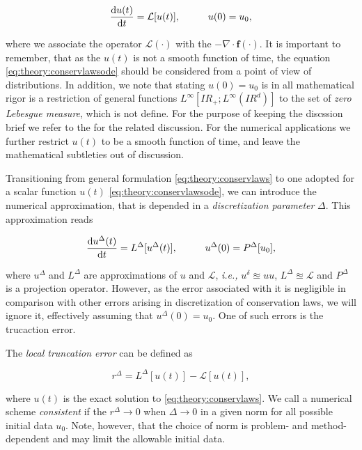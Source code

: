 \begin{equation}
\frac{\text{d}u(t)}{\text{d}t} = \mathcal{L}[u(t)], \hspace{10mm} u(0) = u_0,
\label{eq:theory:conservlawsode}
\end{equation}

where we associate the operator $\mathcal{L}(\cdot)$ with the $-\nabla\cdot\boldsymbol{f}(\cdot)$. 
It is important to remember, that as the $u(t)$ is not a smooth function of time, the equation \ref{eq:theory:conservlawsode} should be considered from a point of view of distributions. 
In addition, we note that stating $u(0) = u_0$ is in all mathematical rigor is a restriction of general functions $L^{\infty}[I\!R_{+};L^{\infty}(I\!R^d)]$ to the set of \textit{zero Lebesgue measure}, which is not define. 
For the purpose of keeping the discssion brief we refer to the \cite{Kruzkov:1970} for the related discussion. 
For the numerical applications we further restrict $u(t)$ to be a smooth function of time, and leave the mathematical subtleties out of discussion. 

Transitioning from general formulation \ref{eq:theory:conservlaws} to one adopted for a scalar function $u(t)$ \ref{eq:theory:conservlawsode}, we can introduce the numerical approximation, that is depended in a \textit{discretization parameter} $\Delta$. 
This approximation reads

\begin{equation}
\frac{\text{d}u^{\Delta}(t)}{\text{d}t} = L^{\Delta}[u^{\Delta}(t)], \hspace{10mm} u^{\Delta}(0) = P^{\Delta}[u_0],
\label{eq:theory:conservlawsodepde}
\end{equation}

where $u^{\Delta}$ and $L^{\Delta}$ are approximations of $u$ and $\mathcal{L}$, \textit{i.e.,} $u^{\delta}\approxeq u u$, $L^{\Delta}\approxeq \mathcal{L}$ and $P^{\Delta}$ is a projection operator. 
However, as the error associated with it is negligible in comparison with other errors arising in discretization of conservation laws, we will ignore it, effectively assuming that $u^{\Delta}(0) = u_0$. 
One of such errors is the trucaction error. 

The \textit{ local truncation error } can be defined as 

\begin{equation}
r^{\Delta} = L^{\Delta}[u(t)] - \mathcal{L}[u(t)],
\end{equation}

where $u(t)$ is the exact solution to \ref{eq:theory:conservlaws}. 
We call a numerical scheme \textit{consistent} if the $r^{\Delta}\rightarrow 0$ when $\Delta\rightarrow 0$ in a given norm for all possible initial data $u_0$. 
Note, however, that the choice of norm is problem- and method- dependent and may limit the allowable initial data. 

